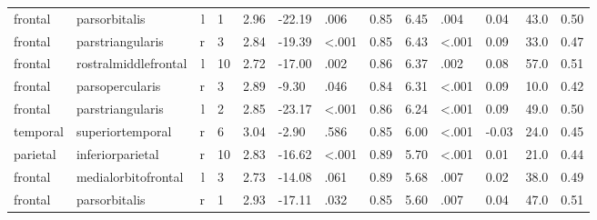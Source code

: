 \documentclass{article}
\begin{document}
\begin{longtable}{llrR{1.5cm}R{1cm}R{1.3cm}R{1cm}R{1cm}R{1.3cm}R{1cm}R{1.8cm}R{1.3cm}R{1.8cm}}
   frontal &             parsorbitalis &    l &            1 &                  2.96 &           -22.19 &               .006 &                               0.85 &                          6.45 &                            .004 &  0.04 &   43.0 &      0.50 \\
   frontal &          parstriangularis &    r &            3 &                  2.84 &           -19.39 &      \textless.001 &                               0.85 &                          6.43 &                   \textless.001 &  0.09 &   33.0 &      0.47 \\
   frontal &      rostralmiddlefrontal &    l &           10 &                  2.72 &           -17.00 &               .002 &                               0.86 &                          6.37 &                            .002 &  0.08 &   57.0 &      0.51 \\
   frontal &           parsopercularis &    r &            3 &                  2.89 &            -9.30 &               .046 &                               0.84 &                          6.31 &                   \textless.001 &  0.09 &   10.0 &      0.42 \\
   frontal &          parstriangularis &    l &            2 &                  2.85 &           -23.17 &      \textless.001 &                               0.86 &                          6.24 &                   \textless.001 &  0.09 &   49.0 &      0.50 \\
  temporal &          superiortemporal &    r &            6 &                  3.04 &            -2.90 &               .586 &                               0.85 &                          6.00 &                   \textless.001 & -0.03 &   24.0 &      0.45 \\
  parietal &          inferiorparietal &    r &           10 &                  2.83 &           -16.62 &      \textless.001 &                               0.89 &                          5.70 &                   \textless.001 &  0.01 &   21.0 &      0.44 \\
   frontal &       medialorbitofrontal &    l &            3 &                  2.73 &           -14.08 &               .061 &                               0.89 &                          5.68 &                            .007 &  0.02 &   38.0 &      0.49 \\
   frontal &             parsorbitalis &    r &            1 &                  2.93 &           -17.11 &               .032 &                               0.85 &                          5.60 &                            .007 &  0.04 &   47.0 &      0.51 \\

\end{longtable}
\end{document}
